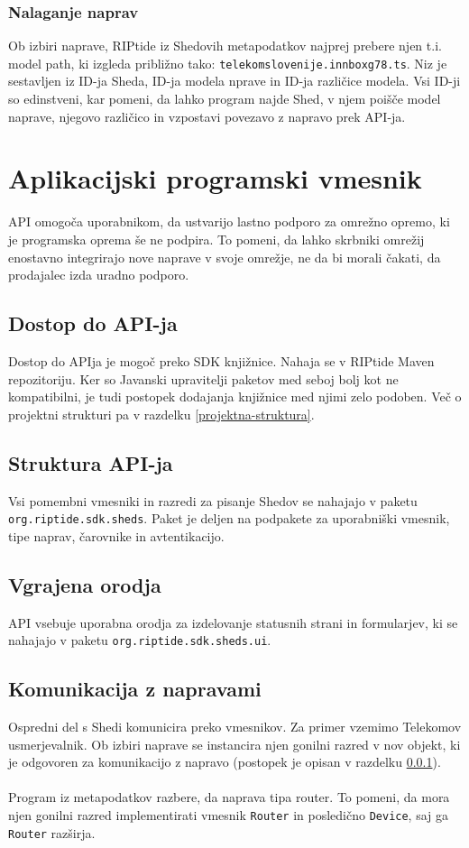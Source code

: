 \documentclass[12pt]{article}
\begin{document}
\subsubsection{Nalaganje naprav} \label{nalaganje-naprav}
Ob izbiri naprave, RIPtide iz Shedovih metapodatkov najprej prebere
njen t.i. model path, ki izgleda približno
tako: \texttt{telekomslovenije.innboxg78.ts}. Niz je sestavljen iz ID-ja
Sheda, ID-ja modela nprave in ID-ja različice modela. Vsi ID-ji so
edinstveni, kar pomeni, da lahko program najde Shed, v njem poišče model
naprave, njegovo različico in vzpostavi povezavo z napravo prek API-ja.
\newpage

\section{Aplikacijski programski vmesnik}
API omogoča uporabnikom, da ustvarijo lastno podporo za omrežno
opremo, ki je programska oprema še ne podpira. To pomeni, da lahko
skrbniki omrežij enostavno integrirajo nove naprave v svoje omrežje, ne da
bi morali čakati, da prodajalec izda uradno podporo.

\subsection{Dostop do API-ja}
Dostop do APIja je mogoč preko SDK knjižnice. Nahaja se v RIPtide
Maven repozitoriju. Ker so Javanski upravitelji paketov med seboj bolj
kot ne kompatibilni, je tudi postopek dodajanja knjižnice med njimi
zelo podoben. Več o projektni strukturi pa v razdelku
\ref{projektna-struktura}.

\subsection{Struktura API-ja}
Vsi pomembni vmesniki in razredi za pisanje Shedov se nahajajo v
paketu \texttt{org\-.riptide.sdk.sheds}. Paket je deljen na podpakete za
uporabniški vmesnik, tipe naprav, čarovnike in avtentikacijo.

\subsection{Vgrajena orodja}
API vsebuje uporabna orodja za izdelovanje statusnih strani in
formularjev, ki se nahajajo v paketu \texttt{org.riptide.sdk.sheds.ui}.

\subsection{Komunikacija z napravami} \label{komunikacija-z-napravami}
Ospredni del s Shedi komunicira preko vmesnikov. Za primer vzemimo
Telekomov usmerjevalnik. Ob izbiri naprave se instancira njen gonilni
razred v nov objekt, ki je odgovoren za komunikacijo z napravo
(postopek je opisan v razdelku \ref{nalaganje-naprav}).
\\\\
Program iz metapodatkov razbere, da naprava tipa router. To pomeni,
da mora njen gonilni razred implementirati vmesnik \texttt{Router} in
posledično \texttt{Device}, saj ga \texttt{Router} razširja.
\newpage
\end{document}
